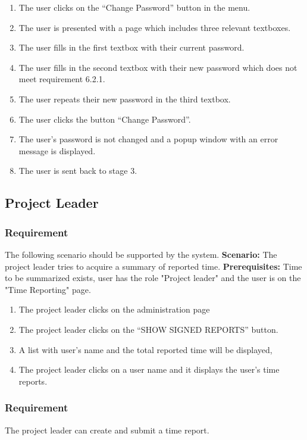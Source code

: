 \documentclass{article}
\begin{document}
\begin{enumerate}
    \item The user clicks on the “Change Password” button in the menu.
    \item The user is presented with a page which includes three relevant textboxes.
    \item The user fills in the first textbox with their current password.
    \item The user fills in the second textbox with their new password which does not meet requirement 6.2.1.
    \item The user repeats their new password in the third textbox.
    \item The user clicks the button “Change Password”.
    \item The user's password is not changed and a popup window with an error message is displayed.
    \item The user is sent back to stage 3.
\end{enumerate}

\subsection{Project Leader}
\subsubsection{Requirement}
The following scenario should be supported by the system.
\textbf{Scenario:} The project leader tries to acquire a summary of reported time.
\textbf{Prerequisites:} Time to be summarized exists, user has the role "Project leader" and the user is on the "Time Reporting" page.

\begin{enumerate}
    \item The project leader clicks on the administration page 
    \item The project leader clicks on the “SHOW SIGNED REPORTS” button.
    \item A list with user’s name and the total reported time will be displayed,
    \item The project leader clicks on a user name and it displays the user’s time reports.
\end{enumerate}

\subsubsection{Requirement}
The project leader can create and submit a time report.
\end{document}
